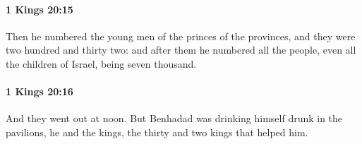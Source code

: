 		\paragraph{1 Kings 20:15} %
			\label{1KINGS-20-15}

			Then he numbered the young men of the princes of the provinces, and they were two hundred and thirty two: and after them he numbered all the people, even all the children of Israel, being seven thousand.


		\paragraph{1 Kings 20:16} %
			\label{1KINGS-20-16}

			And they went out at noon. But Benhadad was drinking himself drunk in the pavilions, he and the kings, the thirty and two kings that helped him.


